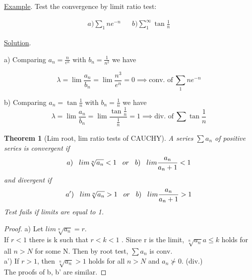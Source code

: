 \documentclass[11pt]{amsbook}
\newtheorem{theorem}{Theorem}
\begin{document}
		\underline{Example}. Test the convergence by limit ratio test:
		
		\begin{align*}
		a) \sum_1 n e^{-n} &&  b) \sum_1^\infty \tan{\frac{1}{n}}
		\end{align*}
		
		\underline{Solution}.
		
		a) Comparing $a_n = \frac{n}{e^n}$ with $b_n = \frac{1}{n^2}$ we have
		
		$$\lambda = \lim{\frac{a_n}{b_n}} = \lim{\frac{n^3}{e^n}} = 0 \implies \text{conv. of}\ \sum_1 n e^{-n}$$
		
		b) Comparing $a_n = \tan{\frac{1}{n}}$ with $b_n = \frac{1}{n}$ we have
		$$\lambda = \lim{\frac{a_n}{b_n}} = \lim{\frac{\tan{\frac{1}{n}}}{\frac{1}{n}}}  = 1 \implies \text{div. of} \ \sum \tan{\frac{1}{n}}$$  
\begin{theorem} [Lim root, lim ratio tests of CAUCHY] 
A series  $\sum {a_n} $  of positive series is convergent if 
\begin{equation}
a)\hspace{3mm}  lim \sqrt[n]{a_n} <  1  \hspace{3mm} or  \hspace{3mm}   b)\hspace{3mm} lim \frac{a_n}{a_n+1} < 1 
\end{equation}
and divergent if
\begin{equation}
a')\hspace{3mm} lim \sqrt[n]{a_n} >  1   \hspace{3mm}  or \hspace{3mm}  b)\hspace{3mm}  lim \frac{a_n}{a_n+1} > 1 
\end{equation}
Test fails if limits are equal to 1.
\end{theorem}

\begin{proof} 
a) Let $lim \sqrt[n]{a_n} = r$. \\
If $r < 1$ there is k such that $r <  k  < 1$ . Since r is the limit, $\sqrt[n]{a_n} a \leq k$ holds for all $n  > N$ for some N. Then by root test, $\sum {a_n} $ is conv. \\
a') If $r > 1$, then $\sqrt[n]{a_n} > 1$ holds for all $n > N$ and ${a_n} \nsucc  0$. (div.) \\
The proofs of b, b'  are similar.
\end{proof}
\end{document}
